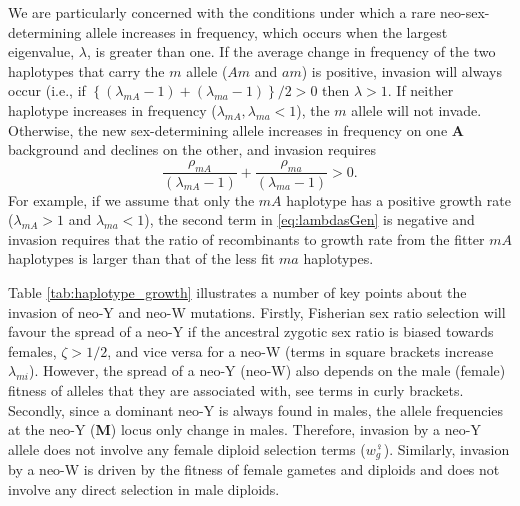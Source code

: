 \documentclass[12pt]{article}
\begin{document}

We are particularly concerned with the conditions under which a rare neo-sex-determining allele increases in frequency, which occurs when the largest eigenvalue, $\lambda$, is greater than one. 
If the average change in frequency of the two haplotypes that carry the $m$ allele ($Am$ and $am$) is positive, invasion will always occur (i.e., if $\left\{(\lambda_{mA}-1)+ (\lambda_{ma}-1) \right\}/2 > 0$ then $\lambda > 1$. 
If neither haplotype increases in frequency ($\lambda_{mA}, \lambda_{ma} < 1$), the $m$ allele will not invade. 
Otherwise, the new sex-determining allele increases in frequency on one \textbf{A} background and declines on the other, and invasion requires
\begin{equation}\label{eq:lambdasGen}
\frac{\rho_{mA}}{(\lambda_{mA}-1)}+\frac{\rho_{ma}}{(\lambda_{ma}-1)}>0.
\end{equation}
\noindent For example, if we assume that only the $mA$ haplotype has a positive growth rate ($\lambda_{mA}>1$ and $\lambda_{ma}<1$), the second term in \eqref{eq:lambdasGen} is negative and invasion requires that the ratio of recombinants to growth rate from the fitter $mA$ haplotypes is larger than that of the less fit $ma$ haplotypes. 

Table \ref{tab:haplotype_growth} illustrates a number of key points about the invasion of neo-Y and neo-W mutations. 
Firstly, Fisherian sex ratio selection will favour the spread of a neo-Y if the ancestral zygotic sex ratio is biased towards females, $\zeta>1/2$, and vice versa for a neo-W (terms in square brackets increase $\lambda_{mi}$).
However, the spread of a neo-Y (neo-W) also depends on the male (female) fitness of alleles that they are associated with, see terms in curly brackets. 
Secondly, since a dominant neo-Y is always found in males, the allele frequencies at the neo-Y (\textbf{M}) locus only change in males. 
Therefore, invasion by a neo-Y allele does not involve any female diploid selection terms ($w_{g}^{\female}$). 
Similarly, invasion by a neo-W is driven by the fitness of female gametes and diploids and does not involve any direct selection in male diploids. 
\end{document}
